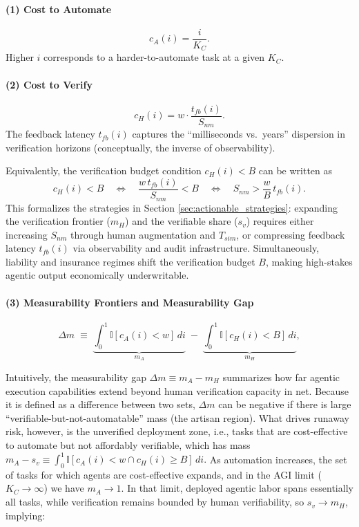\documentclass[12pt, letter]{article}
\begin{document}
\paragraph{(1) Cost to Automate}
\begin{equation}
c_A(i) = \frac{i}{K_C}.
 \label{eq:cA-core}
\end{equation}
Higher $i$ corresponds to a harder-to-automate task at a given $K_C$.

\paragraph{(2) Cost to Verify}
\begin{equation}
c_H(i) = w \cdot \frac{t_{fb}(i)}{S_{nm}}.
 \label{eq:cH-core}
\end{equation}
The feedback latency $t_{fb}(i)$ captures the ``milliseconds vs.\ years'' dispersion in
verification horizons (conceptually, the inverse of observability).

Equivalently, the verification budget condition $c_H(i)<B$ can be written as
\[
c_H(i)<B
\quad\Longleftrightarrow\quad
\frac{w\,t_{fb}(i)}{S_{nm}}<B
\quad\Longleftrightarrow\quad
S_{nm}>\frac{w}{B}\,t_{fb}(i).
\]
This formalizes the strategies in Section \ref{sec:actionable_strategies}: expanding the verification frontier ($m_H$) and the verifiable share ($s_v$) requires either increasing $S_{nm}$ through human augmentation and $T_{sim}$, or compressing feedback latency $t_{fb}(i)$ via observability and audit infrastructure. Simultaneously, liability and insurance regimes shift the verification budget $B$, making high-stakes agentic output economically underwritable.

\paragraph{(3) Measurability Frontiers and Measurability Gap}
 

\begin{equation}
\Delta m \;\equiv\; 
\underbrace{\int_0^1 \mathbb{I}[c_A(i) < w]\,di}_{ m_A  } 
\;-\; 
\underbrace{\int_0^1 \mathbb{I}[c_H(i) < B]\,di}_{m_H  },
 \label{eq:gap-core}
\end{equation}

Intuitively, the measurability gap $\Delta m \equiv m_A - m_H$ summarizes how far agentic execution capabilities extend beyond human verification capacity in net. Because it is defined as a difference between two sets, $\Delta m$ can be negative if there is large ``verifiable-but-not-automatable'' mass (the artisan region). What drives runaway risk, however, is the unverified deployment zone, i.e., tasks that are cost-effective to automate but not affordably verifiable, which has mass $m_A-s_v \equiv \int_0^1 \mathbb{I}\!\left[c_A(i) < w \cap c_H(i) \ge B\right]\,di.$
As automation increases, the set of tasks for which agents are cost-effective expands, and in the AGI limit ($K_C \to \infty$) we have $m_A\to 1$.  In that limit, deployed agentic labor spans essentially all tasks, while verification remains bounded by human verifiability, so $s_v \to m_H$, implying:
\end{document}

